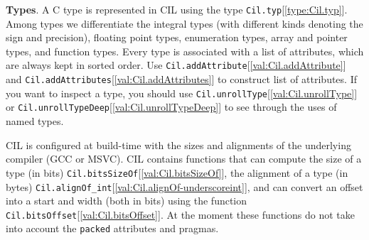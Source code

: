 \documentclass[11pt]{article}
\begin{document}
{\bf Types}. A C type is represented in CIL using the type {\tt{Cil.typ}}[\ref{type:Cil.typ}]. 
 Among types we differentiate the integral types (with different kinds 
 denoting the sign and precision), floating point types, enumeration types, 
 array and pointer types, and function types. Every type is associated with 
 a list of attributes, which are always kept in sorted order. Use 
 {\tt{Cil.addAttribute}}[\ref{val:Cil.addAttribute}] and {\tt{Cil.addAttributes}}[\ref{val:Cil.addAttributes}] to construct list of 
 attributes. If you want to inspect a type, you should use 
 {\tt{Cil.unrollType}}[\ref{val:Cil.unrollType}] or {\tt{Cil.unrollTypeDeep}}[\ref{val:Cil.unrollTypeDeep}] to see through the uses of 
 named types.



CIL is configured at build-time with the sizes and alignments of the 
 underlying compiler (GCC or MSVC). CIL contains functions that can compute 
 the size of a type (in bits) {\tt{Cil.bitsSizeOf}}[\ref{val:Cil.bitsSizeOf}], the alignment of a type 
 (in bytes) {\tt{Cil.alignOf\_int}}[\ref{val:Cil.alignOf-underscoreint}], and can convert an offset into a start and 
 width (both in bits) using the function {\tt{Cil.bitsOffset}}[\ref{val:Cil.bitsOffset}]. At the moment 
 these functions do not take into account the {\tt{packed}} attributes and 
 pragmas.
\end{document}
